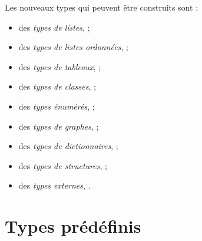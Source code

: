 
Les nouveaux types qui peuvent être construits sont :
\begin{itemize}
  \item des \emph{types de listes},  ;
  \item des \emph{types de listes ordonnées},  ;
  \item des \emph{types de tableaux},  ;
  \item des \emph{types de classes},  ;
  \item des \emph{types énumérés},  ;
  \item des \emph{types de graphes},  ;
  \item des \emph{types de dictionnaires},  ;
  \item des \emph{types de structures},  ;
  \item des \emph{types externes}, .
\end{itemize}









\section{Types prédéfinis}

